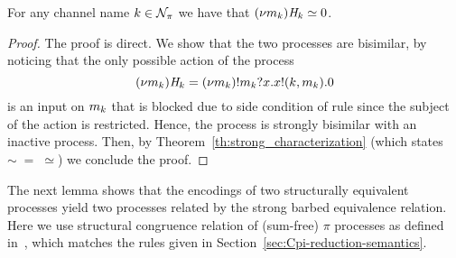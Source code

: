 \begin{proposition}\label{prop:rest_handler_bisimilar_to_0}
For any channel name $k\in{\cal N}_\pi$ we have that $(\nu m_k)\mathit{H}_k\simeq0$.
\end{proposition}
\begin{proof}
The proof is direct. We show that the two processes are bisimilar, by noticing that the only possible action of the process
\[(\nu m_k)\mathit{H}_k= (\nu m_k)! m_k?x.x!(k,m_k).0
\]
is an input on $m_k$ that is blocked due to side condition of rule  since the subject of the action is restricted. Hence, the process is strongly bisimilar with an inactive process. Then, by Theorem~\ref{th:strong_characterization} (which states $\sim \;=\; \simeq$) we conclude the proof.
\end{proof}

The next lemma shows that the encodings of two structurally equivalent processes yield two processes related by the strong barbed equivalence relation. Here we use structural congruence relation of (sum-free) $\pi$ processes as defined in~\cite{pi_calculus}, which matches the rules given in Section~\ref{sec:Cpi-reduction-semantics}.

